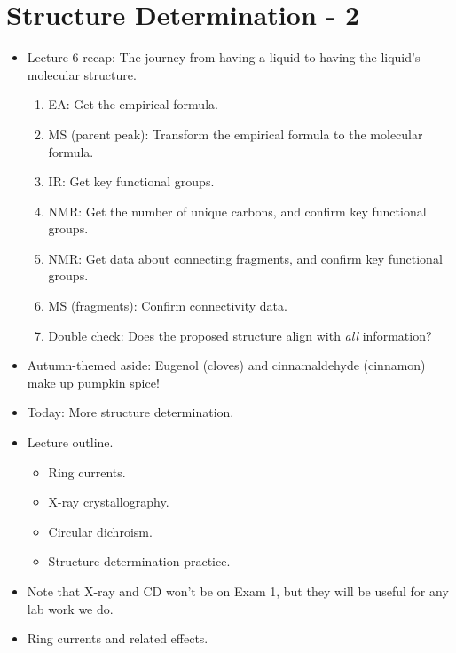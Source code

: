 \documentclass[../notes.tex]{subfiles}
\begin{document}
\section{Structure Determination - 2}
\begin{itemize}
    \item {}Lecture 6 recap: The journey from having a liquid to having the liquid's molecular structure.
    \begin{enumerate}
        \item EA: Get the empirical formula.
        \item MS (parent peak): Transform the empirical formula to the molecular formula.
        \item IR: Get key functional groups.
        \item {} NMR: Get the number of unique carbons, and confirm key functional groups.
        \item {} NMR: Get data about connecting fragments, and confirm key functional groups.
        \item MS (fragments): Confirm connectivity data.
        \item Double check: Does the proposed structure align with \emph{all} information?
    \end{enumerate}
    \item Autumn-themed aside: Eugenol (cloves) and cinnamaldehyde (cinnamon) make up pumpkin spice!
    \item Today: More structure determination.
    \item Lecture outline.
    \begin{itemize}
        \item Ring currents.
        \item X-ray crystallography.
        \item Circular dichroism.
        \item Structure determination practice.
    \end{itemize}
    \item Note that X-ray and CD won't be on Exam 1, but they will be useful for any lab work we do.
    \pagebreak
    \item Ring currents and related effects.
    \begin{figure}[h!]
        \centering
        \vspace{4em}
        \footnotesize
        \begin{subfigure}[b]{0.28\linewidth}
            \centering

\end{subfigure}
\end{figure}
\end{itemize}
\end{document}
